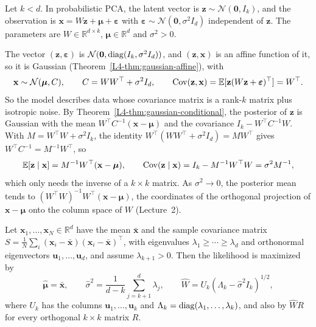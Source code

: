 \begin{definition}\label{L4-def:ppca}
    Let $k < d$. In probabilistic PCA, the latent vector is $\mathbf{z} \sim \mathcal{N}(\mathbf{0}, I_k)$, and the observation is $\mathbf{x} = W\mathbf{z} + \boldsymbol{\mu} + \boldsymbol{\varepsilon}$ with $\boldsymbol{\varepsilon} \sim \mathcal{N}(\mathbf{0}, \sigma^2I_d)$ independent of $\mathbf{z}$. The parameters are $W \in \mathbb{R}^{d \times k}$, $\boldsymbol{\mu} \in \mathbb{R}^d$ and $\sigma^2 > 0$.
\end{definition}

The vector $(\mathbf{z}, \boldsymbol{\varepsilon})$ is $\mathcal{N}(\mathbf{0}, \operatorname{diag}(I_k, \sigma^2I_d))$, and $(\mathbf{z}, \mathbf{x})$ is an affine function of it, so it is Gaussian (Theorem~\ref{L4-thm:gaussian-affine}), with
\[\mathbf{x} \sim \mathcal{N}(\boldsymbol{\mu}, C), \qquad C = WW^\top + \sigma^2I_d, \qquad \operatorname{Cov}(\mathbf{z}, \mathbf{x}) = \mathbb{E}[\mathbf{z}(W\mathbf{z} + \boldsymbol{\varepsilon})^\top] = W^\top.\]
So the model describes data whose covariance matrix is a rank-$k$ matrix plus isotropic noise. By Theorem~\ref{L4-thm:gaussian-conditional}, the posterior of $\mathbf{z}$ is Gaussian with the mean $W^\top C^{-1}(\mathbf{x} - \boldsymbol{\mu})$ and the covariance $I_k - W^\top C^{-1}W$. With $M = W^\top W + \sigma^2I_k$, the identity $W^\top(WW^\top + \sigma^2I_d) = MW^\top$ gives $W^\top C^{-1} = M^{-1}W^\top$, so
\[\mathbb{E}[\mathbf{z} \mid \mathbf{x}] = M^{-1}W^\top(\mathbf{x} - \boldsymbol{\mu}), \qquad \operatorname{Cov}(\mathbf{z} \mid \mathbf{x}) = I_k - M^{-1}W^\top W = \sigma^2M^{-1},\]
which only needs the inverse of a $k \times k$ matrix. As $\sigma^2 \to 0$, the posterior mean tends to $(W^\top W)^{-1}W^\top(\mathbf{x} - \boldsymbol{\mu})$, the coordinates of the orthogonal projection of $\mathbf{x} - \boldsymbol{\mu}$ onto the column space of $W$ (Lecture~2).

\begin{theorem}\label{L4-thm:ppca}
    Let $\mathbf{x}_1, \ldots, \mathbf{x}_N \in \mathbb{R}^d$ have the mean $\bar{\mathbf{x}}$ and the sample covariance matrix $S = \frac{1}{N}\sum_i (\mathbf{x}_i - \bar{\mathbf{x}})(\mathbf{x}_i - \bar{\mathbf{x}})^\top$, with eigenvalues $\lambda_1 \geq \cdots \geq \lambda_d$ and orthonormal eigenvectors $\mathbf{u}_1, \ldots, \mathbf{u}_d$, and assume $\lambda_{k+1} > 0$. Then the likelihood is maximized by
    \[\hat{\boldsymbol{\mu}} = \bar{\mathbf{x}}, \qquad \hat\sigma^2 = \frac{1}{d - k}\sum_{j=k+1}^d \lambda_j, \qquad \hat W = U_k(\Lambda_k - \hat\sigma^2I_k)^{1/2},\]
    where $U_k$ has the columns $\mathbf{u}_1, \ldots, \mathbf{u}_k$ and $\Lambda_k = \operatorname{diag}(\lambda_1, \ldots, \lambda_k)$, and also by $\hat WR$ for every orthogonal $k \times k$ matrix $R$.
\end{theorem}

